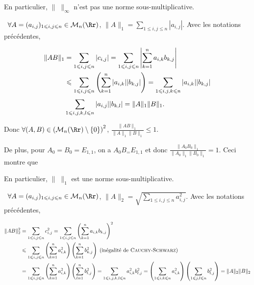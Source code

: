 {\begin{enumerate}
{En particulier, $\|\;\|_\infty$ n'est pas une norme sous-multiplicative.

\textbullet~$\forall A=(a_{i,j})_{1\leqslant i,j\leqslant n}\in\mathcal{M}_n(\Rr)$, $\|A\|_1=\sum_{1\leqslant i,j\leqslant n}^{}|a_{i,j}|$. Avec les notations précédentes,

\begin{align*}\ensuremath
\|AB\|_1&=\sum_{1\leqslant i,j\leqslant n}^{}|c_{i,j}|=\sum_{1\leqslant i,j\leqslant n}^{}\left|\sum_{k=1}^{n}a_{i,k}b_{k,j}\right|\\
 &\leqslant\sum_{1\leqslant i,j\leqslant n}^{}\left(\sum_{k=1}^{n}|a_{i,k}||b_{k,j}|\right)=\sum_{1\leqslant i,j,k\leqslant n}^{}|a_{i,k}||b_{k,j}|\\
 &\sum_{1\leqslant i,j,k,l\leqslant n}^{}|a_{i,j}||b_{k,l}|=\|A\|_1\|B\|_1.
\end{align*}

Donc $\forall(A,B)\in\left(\mathcal{M}_n(\Rr)\setminus\{0\}\right)^2$, $ \frac{\|AB\|_1}{\|A\|_1\|B\|_1}\leqslant 1$.

De plus, pour $A_0=B_0=E_{1,1}$, on a $A_0B_=E_{1,1}$ et donc $ \frac{\|A_0B_0\|_1}{\|A_0\|_1\|B_0\|_1}=1$. Ceci montre que

\begin{center}
\end{center}

En particulier, $\|\;\|_1$ est une norme sous-multiplicative.

\textbullet~$\forall A=(a_{i,j})_{1\leqslant i,j\leqslant n}\in\mathcal{M}_n(\Rr)$, $\|A\|_2=\sqrt{\sum_{1\leqslant i,j\leqslant n}^{}a_{i,j}^2}$. Avec les notations précédentes,

\begin{align*}\ensuremath
\|AB\|_2^2&=\sum_{1\leqslant i,j\leqslant n}^{}c_{i,j}^2=\sum_{1\leqslant i,j\leqslant n}^{}\left(\sum_{k=1}^{n}a_{i,k}b_{k,j}\right)^2\\
 &\leqslant\sum_{1\leqslant i,j\leqslant n}^{}\left(\sum_{k=1}^{n}a_{i,k}^2\right)\left(\sum_{k=1}^{n}b_{k,j}^2\right)\;(\text{inégalité de \textsc{Cauchy}-\textsc{Schwarz}})\\
 &=\sum_{1\leqslant i,j\leqslant n}^{}\left(\sum_{k=1}^{n}a_{i,k}^2\right)\left(\sum_{l=1}^{n}b_{l,j}^2\right)=\sum_{1\leqslant i,j,k,l\leqslant n}^{}a_{i,k}^2b_{l,j}^2=\left(\sum_{1\leqslant i,k\leqslant n}^{}a_{i,k}^2\right)\left(\sum_{1\leqslant j,l\leqslant n}^{}b_{l,j}^2\right)=\|A\|_2\|B\|_2
\end{align*}

}
\end{enumerate}}
